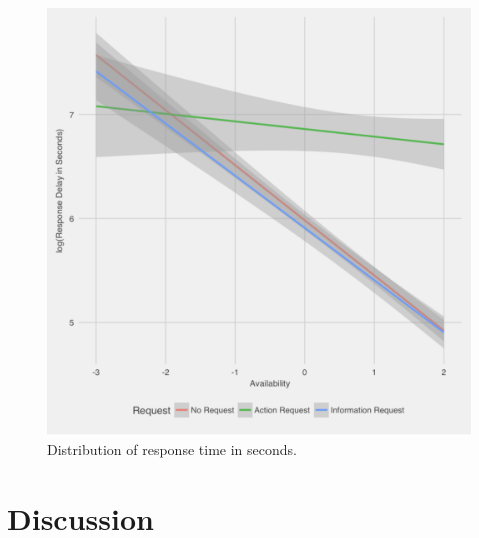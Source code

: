 \documentclass[12pt]{nuthesis}	%
\begin{document}
\begin{figure}[h]
\centering
\includegraphics[width=.7\textwidth]{figures/request_availability_interaction}
\caption{Distribution of response time in seconds.}
\label{fig:request_availability_interaction}
\end{figure}


\chapter{Discussion}

 \renewcommand\refname{\begin{centering}References\end{centering}}
 




\end{document}

